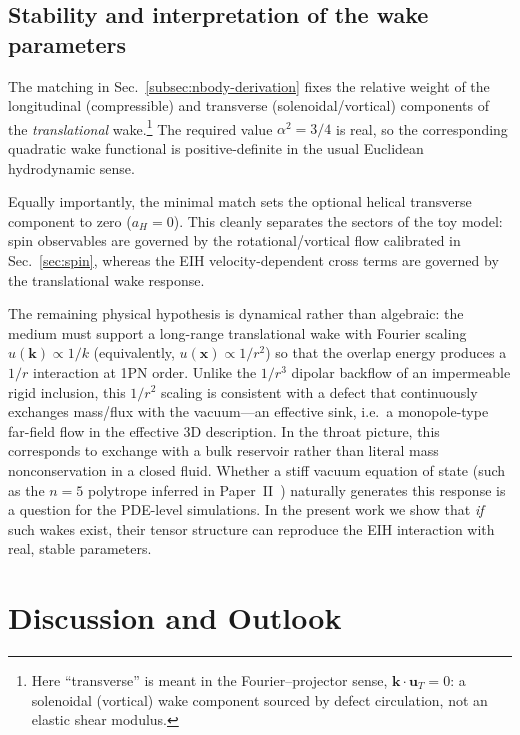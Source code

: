 \documentclass[11pt]{article}
\begin{document}
\subsection{Stability and interpretation of the wake parameters}
\label{subsec:nbody-signature}

The matching in Sec.~\ref{subsec:nbody-derivation} fixes the relative weight
of the longitudinal (compressible) and transverse (solenoidal/vortical) components of the
\emph{translational} wake.\footnote{Here ``transverse'' is meant in the Fourier--projector sense, $\mathbf{k}\cdot\mathbf{u}_T=0$: a solenoidal (vortical) wake component sourced by defect circulation, not an elastic shear modulus.}  The required value $\alpha^2=3/4$ is real, so the
corresponding quadratic wake functional is positive-definite in the usual
Euclidean hydrodynamic sense.

Equally importantly, the minimal match sets the optional helical transverse
component to zero ($a_H=0$).  This cleanly separates the sectors of the toy
model: spin observables are governed by the rotational/vortical flow
calibrated in Sec.~\ref{sec:spin}, whereas the EIH velocity-dependent cross
terms are governed by the translational wake response.

The remaining physical hypothesis is dynamical rather than algebraic:
the medium must support a long-range translational wake with Fourier scaling
$u(\mathbf{k})\propto 1/k$ (equivalently, $u(\mathbf{x})\propto 1/r^2$) so that
the overlap energy produces a $1/r$ interaction at 1PN order.
Unlike the $1/r^3$ dipolar backflow of an impermeable rigid inclusion, this
$1/r^2$ scaling is consistent with a defect that continuously exchanges mass/flux
with the vacuum---an effective sink, i.e.\ a monopole-type far-field flow in the effective 3D description.
In the throat picture, this corresponds to exchange with a bulk reservoir rather
than literal mass nonconservation in a closed fluid.
Whether a stiff vacuum equation of state (such as the $n=5$ polytrope inferred in
Paper~II~\cite{Norris:Paper2}) naturally generates this response is a question
for the PDE-level simulations.  In the present work we show that \emph{if} such
wakes exist, their tensor structure can reproduce the EIH interaction with
real, stable parameters.

\section{Discussion and Outlook}
\label{sec:discussion}
\end{document}

